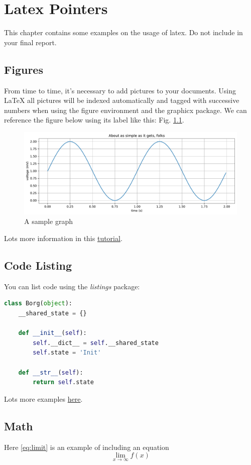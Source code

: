 \chapter{Latex Pointers}

This chapter contains some examples on the usage of latex. Do not include in your final report.

\section{Figures}
From time to time, it's necessary to add pictures to your documents. Using LaTeX all pictures will be indexed automatically and tagged with successive numbers when using the figure environment and the graphicx package. We can reference the figure below using its label like this: Fig. \ref{fig:test_plot}.
\begin{figure}[h]
    \centering
  \includegraphics[width=0.8\linewidth]{test_plot.pdf}
  \caption{A sample graph}
  \label{fig:test_plot}
\end{figure}

Lots more information in this \href{https://www.latex-tutorial.com/tutorials/figures/}{tutorial}.


\section{Code Listing}
You can list code using the \emph{listings} package:

\begin{lstlisting}[language=Python,caption=Borg Pattern]
class Borg(object):
    __shared_state = {}

    def __init__(self):
        self.__dict__ = self.__shared_state
        self.state = 'Init'

    def __str__(self):
        return self.state
\end{lstlisting}

Lots more examples \href{https://www.overleaf.com/learn/latex/Code_listing}{here}.

\section{Math}
Here \ref{eq:limit} is an example of including an equation
\begin{equation}
\lim_{x\to\infty} f(x)
\label{eq:limit}
\end{equation}

